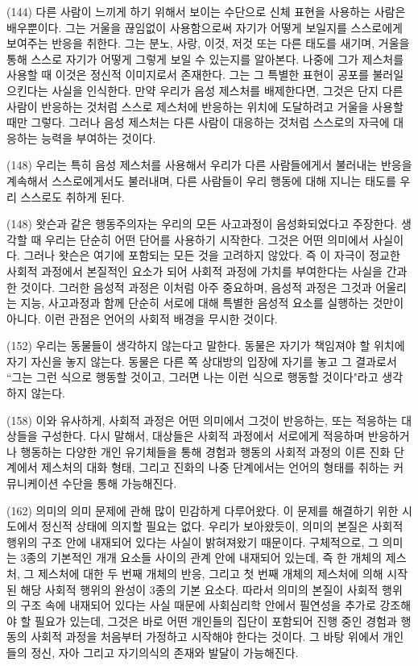 \documentclass[12pt, a4paper]{article}
\begin{document}
(144) 다른 사람이 느끼게 하기 위해서 보이는 수단으로 신체 표현을 사용하는 사람은 배우뿐이다. 그는 거울을 끊임없이 사용함으로써 자기가 어떻게 보일지를 스스로에게 보여주는 반응을 취한다. 그는 분노, 사랑, 이것, 저것 또는 다른 태도를 새기며, 거울을 통해 스스로 자기가 어떻게 그렇게 보일 수 있는지를 알아본다. 나중에 그가 제스처를 사용할 때 이것은 정신적 이미지로서 존재한다. 그는 그 특별한 표현이 공포를 불러일으킨다는 사실을 인식한다. 만약 우리가 음성 제스처를 배제한다면, 그것은 단지 다른 사람이 반응하는 것처럼 스스로 제스처에 반응하는 위치에 도달하려고 거울을 사용할 때만 그렇다. 그러나 음성 제스처는 다른 사람이 대응하는 것처럼 스스로의 자극에 대응하는 능력을 부여하는 것이다. 

(148) 우리는 특히 음성 제스처를 사용해서 우리가 다른 사람들에게서 불러내는 반응을 계속해서 스스로에게서도 불러내며, 다른 사람들이 우리 행동에 대해 지니는 태도를 우리 스스로도 취하게 된다.

(148) 왓슨과 같은 행동주의자는 우리의 모든 사고과정이 음성화되었다고 주장한다. 생각할 때 우리는 단순히 어떤 단어를 사용하기 시작한다. 그것은 어떤 의미에서 사실이다. 그러나 왓슨은 여기에 포함되는 모든 것을 고려하지 않았다. 즉 이 자극이 정교한 사회적 과정에서 본질적인 요소가 되어 사회적 과정에 가치를 부여한다는 사실을 간과한 것이다. 그러한 음성적 과정은 이처럼 아주 중요하며, 음성적 과정은 그것과 어울리는 지능, 사고과정과 함께 단순히 서로에 대해 특별한 음성적 요소를 실행하는 것만이 아니다. 이런 관점은 언어의 사회적 배경을 무시한 것이다.

(152) 우리는 동물들이 생각하지 않는다고 말한다. 동물은 자기가 책임져야 할 위치에 자기 자신을 놓지 않는다. 동물은 다른 쪽 상대방의 입장에 자기를 놓고 그 결과로서 ``그는 그런 식으로 행동할 것이고, 그러면 나는 이런 식으로 행동할 것이다"라고 생각하지 않는다. 

(158) 이와 유사하게, 사회적 과정은 어떤 의미에서 그것이 반응하는, 또는 적응하는 대상들을 구성한다. 다시 말해서, 대상들은 사회적 과정에서 서로에게 적응하며 반응하거나 행동하는 다양한 개인 유기체들을 통해 경험과 행동의 사회적 과정의 이른 진화 단계에서 제스처의 대화 형태, 그리고 진화의 나중 단계에서는 언어의 형태를 취하는 커뮤니케이션 수단을 통해 가능해진다. 

(162) 의미의 의미 문제에 관해 많이 민감하게 다루어왔다. 이 문제를 해결하기 위한 시도에서 정신적 상태에 의지할 필요는 없다. 우리가 보아왔듯이, 의미의 본질은 사회적 행위의 구조 안에 내재되어 있다는 사실이 밝혀져왔기 때문이다. 구체적으로, 그 의미는 3종의 기본적인 개개 요소들 사이의 관계 안에 내재되어 있는데, 즉 한 개체의 제스처, 그 제스처에 대한 두 번째 개체의 반응, 그리고 첫 번째 개체의 제스처에 의해 시작된 해당 사회적 행위의 완성이 3종의 기본 요소다. 따라서 의미의 본질이 사회적 행위의 구조 속에 내재되어 있다는 사실 때문에 사회심리학 안에서 필연성을 추가로 강조해야 할 필요가 있는데, 그것은 바로 어떤 개인들의 집단이 포함되어 진행 중인 경험과 행동의 사회적 과정을 처음부터 가정하고 시작해야 한다는 것이다. 그 바탕 위에서 개인들의 정신, 자아 그리고 자기의식의 존재와 발달이 가능해진다.
\end{document}
